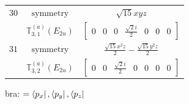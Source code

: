 \documentclass[fleqn,8pt,landscape]{jsarticle}
\begin{document}
\begin{longtable}{ccc}
$ 30 $ & $ \text{symmetry} $ & $ \sqrt{15} x y z $ \\
$  $ & $ \mathbb{T}_{3,1}^{(a)}(E_{2u}) $ & $ \begin{bmatrix} 0 & 0 & 0 & \frac{\sqrt{2} i}{2} & 0 & 0 & 0 \end{bmatrix} $ \\ \hline
$ 31 $ & $ \text{symmetry} $ & $ \frac{\sqrt{15} x^{2} z}{2} - \frac{\sqrt{15} y^{2} z}{2} $ \\
$  $ & $ \mathbb{T}_{3,2}^{(a)}(E_{2u}) $ & $ \begin{bmatrix} 0 & 0 & \frac{\sqrt{2} i}{2} & 0 & 0 & 0 & 0 \end{bmatrix} $ \\ \hline
\end{longtable}
bra: $=\bra{p_{x}}, \bra{p_{y}}, \bra{p_{z}}$
\end{document}
